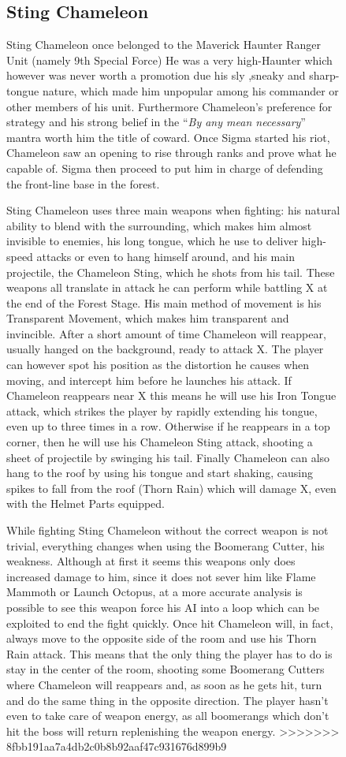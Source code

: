 \begin{figure}[htp]
\subsection{Sting Chameleon}\label{boss:Sting_chameleon}
Sting Chameleon once belonged to the Maverick Haunter Ranger Unit (namely 9th Special Force\cite{wayback:X_resources}) He was a very high-Haunter which however was never worth a promotion due his sly ,sneaky and sharp-tongue nature, which made him unpopular\cite{Xcoll1:Manual_X1} among his commander or other members of his unit. Furthermore Chameleon's preference for strategy and his strong belief in the ``\textit{By any mean necessary}'' mantra  worth him the title of coward\cite{MHX:manual}. Once Sigma started his riot, Chameleon saw an opening to rise through ranks and prove what he capable of. Sigma then proceed to put him in charge of defending the front-line base in the forest.

Sting Chameleon uses three main weapons when fighting\cite{wiki:Sting_chameleon}: his natural ability to blend with the surrounding, which makes him almost invisible to enemies, his long tongue, which he use to deliver high-speed attacks or even to hang himself around, and his main projectile, the Chameleon Sting, which he shots from his tail. These weapons all translate in attack he can perform while battling X at the end of the Forest Stage. His main method of movement is his Transparent Movement, which makes him transparent and invincible. After a short amount of time Chameleon will reappear, usually hanged on the background, ready to attack X. The player can however spot his position as the distortion he causes when moving, and intercept him before he launches his attack. If Chameleon reappears near X this means he will use his Iron Tongue attack, which strikes the player by rapidly extending his tongue, even up to three times in a row. Otherwise if he reappears in a top corner, then he will use his Chameleon Sting attack, shooting a sheet of projectile by swinging his tail. Finally Chameleon can also hang to the roof by using his tongue and start shaking, causing spikes to fall from the roof (Thorn Rain) which will damage X, even with the Helmet Parts equipped.

While fighting Sting Chameleon without the correct weapon is not trivial, everything changes when using the Boomerang Cutter, his weakness. Although at first it seems this weapons only does increased damage to him, since it does not sever him like Flame Mammoth or Launch Octopus, at a more accurate analysis is possible to see this weapon force his AI into a loop which can be exploited to end the fight quickly. Once hit Chameleon will, in fact, always move to the opposite side of the room and use his Thorn Rain attack. This means that the only thing the player has to do is stay in the center of the room, shooting some Boomerang Cutters where Chameleon will reappears and, as soon as he gets hit, turn and do the same thing in the opposite direction. The player hasn't even to take care of weapon energy, as all boomerangs which don't hit the boss will return replenishing the weapon energy. 
>>>>>>> 8fbb191aa7a4db2c0b8b92aaf47c931676d899b9


\end{figure}
